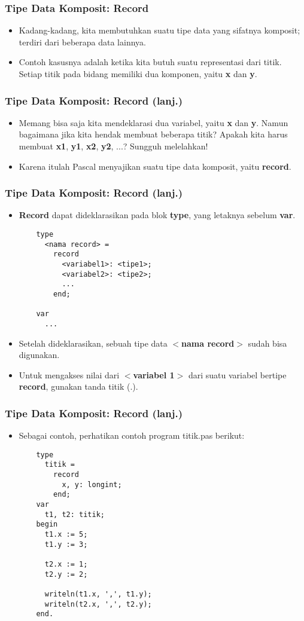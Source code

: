 \begin{frame}
\frametitle{Tipe Data Komposit: Record}
\begin{itemize}
  \item Kadang-kadang, kita membutuhkan suatu tipe data yang sifatnya komposit; terdiri dari beberapa data lainnya.
  \item Contoh kasusnya adalah ketika kita butuh suatu representasi dari titik. Setiap titik pada bidang memiliki dua komponen, yaitu \textbf{x} dan \textbf{y}.
\end{itemize}
\end{frame}

\begin{frame}
\frametitle{Tipe Data Komposit: Record (lanj.)}
\begin{itemize}
  \item Memang bisa saja kita mendeklarasi dua variabel, yaitu \textbf{x} dan \textbf{y}. Namun bagaimana jika kita hendak membuat beberapa titik? Apakah kita harus membuat \textbf{x1}, \textbf{y1}, \textbf{x2}, \textbf{y2}, ...? Sungguh melelahkan!
  \item Karena itulah Pascal menyajikan suatu tipe data komposit, yaitu \alert{\textbf{record}}.
\end{itemize}
\end{frame}

\begin{frame}[fragile]
\frametitle{Tipe Data Komposit: Record (lanj.)}
\begin{itemize}
  \item \textbf{Record} dapat dideklarasikan pada blok \textbf{type}, yang letaknya sebelum \textbf{var}.
  \begin{lstlisting}
    type
      <nama record> =
        record
          <variabel1>: <tipe1>;
          <variabel2>: <tipe2>;
          ...
        end;
        
    var
      ...
  \end{lstlisting}
  \item Setelah dideklarasikan, sebuah tipe data \textbf{$<$nama record$>$} sudah bisa digunakan.
  \item Untuk mengakses nilai dari \textbf{$<$variabel 1$>$} dari suatu variabel bertipe \textbf{record}, gunakan tanda titik (.).
\end{itemize}
\end{frame}

\begin{frame}[fragile]
\frametitle{Tipe Data Komposit: Record (lanj.)}
\begin{itemize}
  \item Sebagai contoh, perhatikan contoh program titik.pas berikut:
  \begin{lstlisting}
    type
      titik =
        record
          x, y: longint;
        end;
    var
      t1, t2: titik;
    begin
      t1.x := 5;
      t1.y := 3;

      t2.x := 1;
      t2.y := 2;

      writeln(t1.x, ',', t1.y);
      writeln(t2.x, ',', t2.y);
    end.
  \end{lstlisting}
\end{itemize}
\end{frame}

